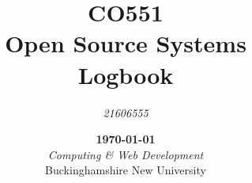 \title{
  \Large CO551\\
  Open Source Systems\\
  \vspace*{.65cm}\huge Logbook\\
  \vfill
}
\author{
  \textit{21606555}
}
\date{
  \vfill\textbf\today\\
  \vspace*{.75cm}\textit{Computing \& Web Development}\\
  Buckinghamshire New University
}
\maketitle
{}
